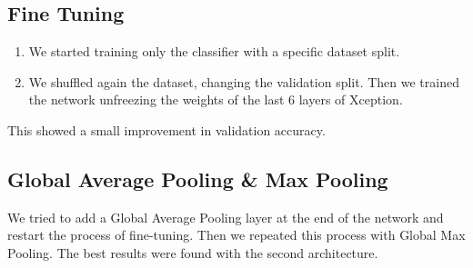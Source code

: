 \documentclass{article}
\begin{document}
		\subsection{Fine Tuning}
		
			\begin{enumerate}
				\item We started training only the classifier with a specific dataset split.
				\item We shuffled again the dataset, changing the validation split. Then we trained the network unfreezing the weights of the last 6 layers of Xception.
			\end{enumerate}
			
			\noindent
			
			This showed a small improvement in validation accuracy.		
			
		\subsection{Global Average Pooling \& Max Pooling} 
			
			We tried to add a Global Average Pooling layer at the end of the network and restart the process of fine-tuning. Then we repeated this process with Global Max Pooling. The best results were found with the second architecture. 
		
\end{document}
